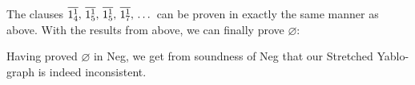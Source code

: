\FloatBarrier
The clauses $\ol{1^1_4},\,\ol{1^1_5},\,\ol{1^1_5},\,\ol{1^1_7},\,\dots$ can be proven in exactly the same manner as above.
With the results from above, we can finally prove $\varnothing$:\par
\begin{figure}[!h]
  \centering
  \begin{prooftree*}
    \Hypo{\dots}
  \end{prooftree*}
  \caption{}
  \label{fig:}
\end{figure}
\FloatBarrier
Having proved $\varnothing$ in Neg, we get from soundness of Neg that our Stretched Yablo-graph is indeed inconsistent.
